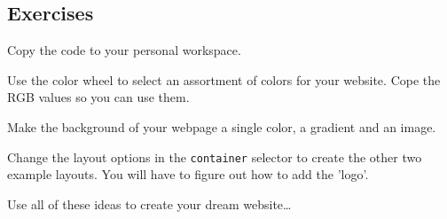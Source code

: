 \documentclass[11pt,a4paper]{report}
\begin{document}
\subsection{Exercises}
\begin{ex}
Copy the code to your personal workspace. 
\end{ex}
\begin{ex}
Use the color wheel to select an assortment of colors for your website. Cope the RGB values so you can use them.
\end{ex}
\begin{ex}
Make the background of your webpage a single color, a gradient and an image.
\end{ex}
\begin{ex}
Change the layout options in the \verb|container| selector to create the other two example layouts. You will have to figure out how to add the 'logo'.
\end{ex}

\begin{ex}
Use all of these ideas to create your dream website\ldots
\end{ex}
\end{document}
